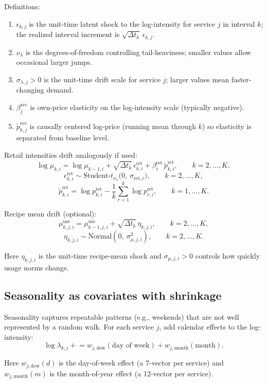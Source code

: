\documentclass[11pt]{article}
\begin{document}
Definitions:
\begin{enumerate}
  \item $\epsilon_{k,j}$ is the unit-time latent shock to the log-intensity for service $j$ in interval $k$; the realized interval increment is $\sqrt{\Delta t_k}\,\epsilon_{k,j}$.
  \item $\nu_{\lambda}$ is the degrees-of-freedom controlling tail-heaviness; smaller values allow occasional larger jumps.
  \item $\sigma_{\lambda,j}>0$ is the unit-time drift scale for service $j$; larger values mean faster-changing demand.
  \item $\beta^{\mathrm{svc}}_j$ is own-price elasticity on the log-intensity scale (typically negative).
  \item $\tilde p^{\mathrm{svc}}_{k,j}$ is causally centered log-price (running mean through $k$) so elasticity is separated from baseline level.
\end{enumerate}

Retail intensities drift analogously if used:
\[
  \log \mu_{k,i} = \log \mu_{k-1,i} + \sqrt{\Delta t_k}\,\epsilon^{\mathrm{ret}}_{k,i} + \beta^{\mathrm{ret}}_i\,\tilde p^{\mathrm{ret}}_{k,i},\qquad k=2,\dots,K,
\]
\[
  \epsilon^{\mathrm{ret}}_{k,i} \sim \text{Student-}t_{\nu_{\lambda}}\bigl(0,\ \sigma_{\mathrm{ret},i}\bigr),\qquad k=2,\dots,K,
\]
\[
  \tilde p^{\mathrm{ret}}_{k,i} = \log p^{\mathrm{ret}}_{k,i} - \frac{1}{k}\sum_{r=1}^{k} \log p^{\mathrm{ret}}_{r,i},\qquad k=1,\dots,K.
\]

Recipe mean drift (optional):
\[
  \mu^{\mathrm{use}}_{k,j,i} = \mu^{\mathrm{use}}_{k-1,j,i} + \sqrt{\Delta t_k}\,\eta_{k,j,i},\qquad k=2,\dots,K,
\]
\[
  \eta_{k,j,i} \sim \text{Normal}(0,\ \sigma^2_{\mu,j,i}),\qquad k=2,\dots,K.
\]

Here $\eta_{k,j,i}$ is the unit-time recipe-mean shock and $\sigma_{\mu,j,i}>0$ controls how quickly usage norms change.

\subsection{Seasonality as covariates with shrinkage}

Seasonality captures repeatable patterns (e.g., weekends) that are not well represented by a random walk.
For each service $j$, add calendar effects to the log-intensity:
\[
  \log \lambda_{k,j} \mathrel{+}= w_{j,\text{dow}}(\text{day of week}) + w_{j,\text{month}}(\text{month}).
\]

Here $w_{j,\text{dow}}(d)$ is the day-of-week effect (a 7-vector per service) and $w_{j,\text{month}}(m)$ is the month-of-year effect (a 12-vector per service).
\end{document}
